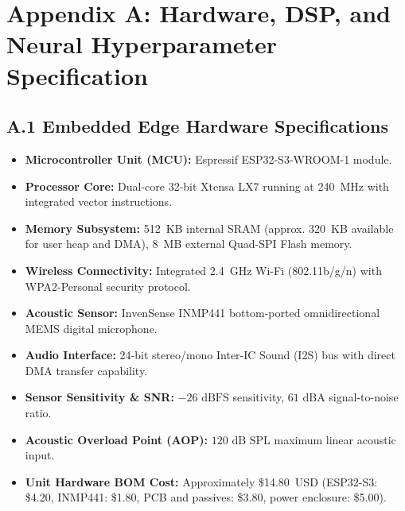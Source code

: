\documentclass[12pt, a4paper]{report}
\begin{document}
\section*{Appendix A: Hardware, DSP, and Neural Hyperparameter Specification}

\subsection*{A.1 Embedded Edge Hardware Specifications}
\begin{itemize}
    \item \textbf{Microcontroller Unit (MCU):} Espressif ESP32-S3-WROOM-1 module.
    \item \textbf{Processor Core:} Dual-core 32-bit Xtensa LX7 running at 240~MHz with integrated vector instructions.
    \item \textbf{Memory Subsystem:} 512~KB internal SRAM (approx. 320~KB available for user heap and DMA), 8~MB external Quad-SPI Flash memory.
    \item \textbf{Wireless Connectivity:} Integrated 2.4~GHz Wi-Fi (802.11b/g/n) with WPA2-Personal security protocol.
    \item \textbf{Acoustic Sensor:} InvenSense INMP441 bottom-ported omnidirectional MEMS digital microphone.
    \item \textbf{Audio Interface:} 24-bit stereo/mono Inter-IC Sound (I2S) bus with direct DMA transfer capability.
    \item \textbf{Sensor Sensitivity \& SNR:} $-26\text{ dBFS}$ sensitivity, $61\text{ dBA}$ signal-to-noise ratio.
    \item \textbf{Acoustic Overload Point (AOP):} $120\text{ dB SPL}$ maximum linear acoustic input.
    \item \textbf{Unit Hardware BOM Cost:} Approximately \$14.80~USD (ESP32-S3: \$4.20, INMP441: \$1.80, PCB and passives: \$3.80, power enclosure: \$5.00).
\end{itemize}
\end{document}
